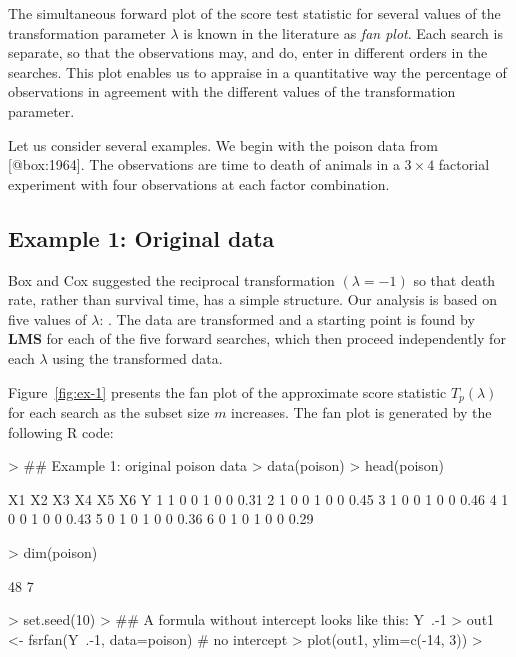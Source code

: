 \documentclass[article,shortnames,nojss]{jss}
\begin{document}
The simultaneous forward plot of the score test statistic for several values of the transformation parameter $\lambda$ is known in the literature as \emph{fan plot}. Each search is separate, so that the observations may, and do, enter in different orders in the searches. This plot enables us to appraise in a quantitative way the percentage of observations in agreement with the different values of the transformation parameter.

Let us consider several examples. We begin with the poison data from [@box:1964]. The observations are time to death of animals in a $3 \times 4$ factorial experiment with four observations at each factor combination.

\subsection[Example 1: Original poison data]{Example 1: Original  data}

Box and Cox suggested the reciprocal transformation $(\lambda = -1)$ so that death rate, rather than survival time, has a simple structure. Our analysis is based on five values of $\lambda$: . The data are transformed and a starting point is found by {\bf LMS} for each of the five forward searches, which then proceed independently for each $\lambda$ using the transformed data.

Figure~\ref{fig:ex-1} presents the fan plot of the approximate score statistic $T_p(\lambda)$ for each search as the subset size $m$ increases.
The fan plot is generated by the following R code:


\begin{Schunk}
\begin{Sinput}
> ##  Example 1: original poison data
> data(poison)
> head(poison)
\end{Sinput}
\begin{Soutput}
  X1 X2 X3 X4 X5 X6    Y
1  1  0  0  1  0  0 0.31
2  1  0  0  1  0  0 0.45
3  1  0  0  1  0  0 0.46
4  1  0  0  1  0  0 0.43
5  0  1  0  1  0  0 0.36
6  0  1  0  1  0  0 0.29
\end{Soutput}
\begin{Sinput}
> dim(poison)
\end{Sinput}
\begin{Soutput}
[1] 48  7
\end{Soutput}
\begin{Sinput}
> set.seed(10)
> ##  A formula without intercept looks like this: Y~.-1
> out1 <- fsrfan(Y~.-1, data=poison)    # no intercept
> plot(out1, ylim=c(-14, 3))
>
\end{Sinput}
\end{Schunk}
\end{document}
